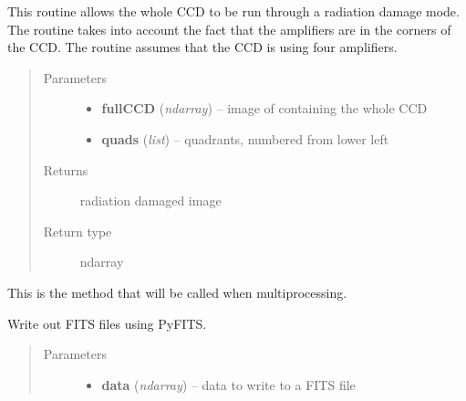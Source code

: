 \documentclass[a4paper,11pt,english]{sphinxmanual}
\begin{document}
\begin{fulllineitems}
\begin{fulllineitems}
\label{postproc:postproc.postprocessing.PostProcessing.radiateFullCCD}
This routine allows the whole CCD to be run through a radiation damage mode.
The routine takes into account the fact that the amplifiers are in the corners
of the CCD. The routine assumes that the CCD is using four amplifiers.
\begin{quote}\begin{description}
\item[{Parameters}] \leavevmode\begin{itemize}
\item {} 
\textbf{fullCCD} (\emph{ndarray}) -- image of containing the whole CCD

\item {} 
\textbf{quads} (\emph{list}) -- quadrants, numbered from lower left

\end{itemize}

\item[{Returns}] \leavevmode
radiation damaged image

\item[{Return type}] \leavevmode
ndarray

\end{description}\end{quote}

\end{fulllineitems}


\begin{fulllineitems}
\label{postproc:postproc.postprocessing.PostProcessing.run}
This is the method that will be called when multiprocessing.

\end{fulllineitems}


\begin{fulllineitems}
\label{postproc:postproc.postprocessing.PostProcessing.writeFITSfile}
Write out FITS files using PyFITS.
\begin{quote}\begin{description}
\item[{Parameters}] \leavevmode\begin{itemize}
\item {} 
\textbf{data} (\emph{ndarray}) -- data to write to a FITS file


\end{itemize}
\end{description}
\end{quote}
\end{fulllineitems}
\end{fulllineitems}
\end{document}
